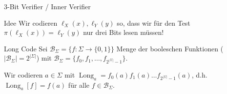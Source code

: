 \documentclass[table,german,10pt]{beamer}
\DeclareMathOperator{\longc}{Long}
\begin{document}
  \begin{frame}{3-Bit Verifier / Inner Verifier}
  \begin{block}{Idee}
    Wir codieren $\ell_{X}(x),\ell_{Y}(y)$ so, dass wir für den Test
    $\pi(\ell_{X}(x))=\ell_{Y}(y)$ nur drei Bits lesen müssen!
  \end{block}
\pause
\begin{block}{Long Code}
  Sei $\mathcal{B}_{\Sigma}=\{f\colon\Sigma\to \{0,1\}\}$ Menge der booleschen
  Funktionen ($|\mathcal{B}_{\Sigma}|=2^{|\Sigma|}$) mit
  $\mathcal{B}_{\Sigma}=\{f_{0},f_{1},\ldots,f_{2^{|\Sigma|}-1}\}$. 

  Wir codieren $a\in \Sigma$ mit $\longc_{a}=f_{0}(a)f_{1}(a)\ldots
  f_{2^{|\Sigma|}-1}(a)$, d.h. $\longc_{a}[f]=f(a)$ für alle $f\in \mathcal{B}_{\Sigma}$.
  
\end{block}
\end{frame}
\end{document}
